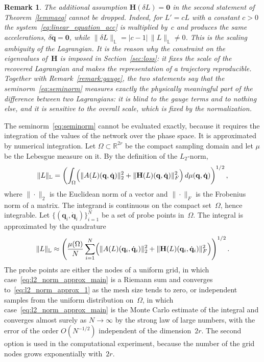 \documentclass[sn-mathphys-num]{sn-jnl}
\theoremstyle{thmstylethree}
\theoremstyle{thmstyletwo}
\newtheorem{remark}{Remark}
\theoremstyle{thmstyleone}
\begin{document}
\begin{remark} \label{remark:scaling}
The additional assumption $\mathbf{H}(\delta L) = \mathbf{0}$ in the second statement of Theorem~\ref{lemmaeq} cannot be dropped. Indeed, for $L' = cL$ with a constant $c > 0$ the system~\eqref{eq:linear_equation_acc} is multiplied by~$c$ and produces the same accelerations, $\delta \ddot{\mathbf{q}} = \mathbf{0}$, while $\|\delta L\|_{\mathbb{L}} = |c-1|\,\|L\|_{\mathbb{L}} \neq 0$. This is the scaling ambiguity of the Lagrangian. It is the reason why the constraint on the eigenvalues of~$\mathbf{H}$ is imposed in Section~\ref{sec:loss}: it fixes the scale of the recovered Lagrangian and makes the representation of a trajectory reproducible. Together with Remark~\ref{remark:gauge}, the two statements say that the seminorm~\eqref{eq:seminorm} measures exactly the physically meaningful part of the difference between two Lagrangians: it is blind to the gauge terms and to nothing else, and it is sensitive to the overall scale, which is fixed by the normalization.
\end{remark}

The seminorm~\eqref{eq:seminorm} cannot be evaluated exactly, because it requires the integration of the values of the network over the phase space. It is approximated by numerical integration. Let $\Omega \subset \mathbb{R}^{2r}$ be the compact sampling domain and let $\mu$ be the Lebesgue measure on it. By the definition of the $L_2$-norm,
\begin{equation}
\label{eq:l2_norm_approx_1}
\|L\|_{\mathbb{L}} = \left(\int_{\Omega} \Bigl(\|A(L)(\mathbf{q},\dot{\mathbf{q}})\|_2^2 + \|\mathbf{H}(L)(\mathbf{q},\dot{\mathbf{q}})\|_F^2\Bigr)\,d\mu(\mathbf{q},\dot{\mathbf{q}})\right)^{1/2},
\end{equation}
where $\|\cdot\|_2$ is the Euclidean norm of a vector and $\|\cdot\|_F$ is the Frobenius norm of a matrix. The integrand is continuous on the compact set~$\Omega$, hence integrable. Let $\{(\mathbf{q}_i,\dot{\mathbf{q}}_i)\}_{i=1}^N$ be a set of probe points in~$\Omega$. The integral is approximated by the quadrature
\begin{equation}\label{eq:l2_norm_approx_main}
\|L\|_{\mathbb{L}} \approx \left(\frac{\mu(\Omega)}{N} \sum_{i=1}^N \Bigl(\|A(L)(\mathbf{q}_i,\dot{\mathbf{q}}_i)\|_2^2 + \|\mathbf{H}(L)(\mathbf{q}_i,\dot{\mathbf{q}}_i)\|_F^2\Bigr)\right)^{1/2}.
\end{equation}
The probe points are either the nodes of a uniform grid, in which case~\eqref{eq:l2_norm_approx_main} is a Riemann sum and converges to~\eqref{eq:l2_norm_approx_1} as the mesh size tends to zero, or independent samples from the uniform distribution on~$\Omega$, in which case~\eqref{eq:l2_norm_approx_main} is the Monte Carlo estimate of the integral and converges almost surely as $N \to \infty$ by the strong law of large numbers, with the error of the order $O(N^{-1/2})$ independent of the dimension~$2r$. The second option is used in the computational experiment, because the number of the grid nodes grows exponentially with~$2r$.
\end{document}
